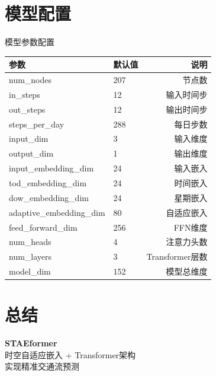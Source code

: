 \documentclass[12pt]{ctexbeamer}
\begin{document}
\section{模型配置}

\begin{frame}{模型参数配置}
	\begin{table}
		\centering
		\begin{tabular}{llr}
			\toprule
			参数                       & 默认值 & 说明            \\
			\midrule
			num\_nodes               & 207 & 节点数           \\
			in\_steps                & 12  & 输入时间步         \\
			out\_steps               & 12  & 输出时间步         \\
			steps\_per\_day          & 288 & 每日步数          \\
			input\_dim               & 3   & 输入维度          \\
			output\_dim              & 1   & 输出维度          \\
			input\_embedding\_dim    & 24  & 输入嵌入          \\
			tod\_embedding\_dim      & 24  & 时间嵌入          \\
			dow\_embedding\_dim      & 24  & 星期嵌入          \\
			adaptive\_embedding\_dim & 80  & 自适应嵌入         \\
			feed\_forward\_dim       & 256 & FFN维度         \\
			num\_heads               & 4   & 注意力头数         \\
			num\_layers              & 3   & Transformer层数 \\
			model\_dim               & 152 & 模型总维度         \\
			\bottomrule
		\end{tabular}
	\end{table}
\end{frame}

\section{总结}

\begin{frame}[standout]
	\centering
	\textbf{STAEformer} \\
	时空自适应嵌入 + Transformer架构 \\
	实现精准交通流预测
\end{frame}
\end{document}
